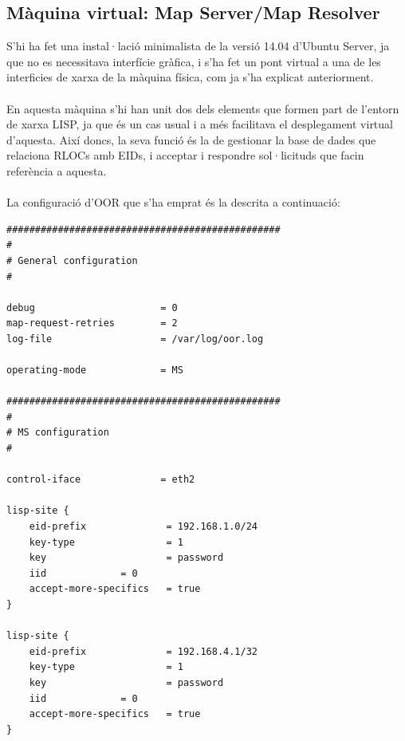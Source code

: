 \documentclass[11pt]{article}
\begin{document}
\subsection{Màquina virtual: Map Server/Map Resolver}
S’hi ha fet una instal·lació minimalista de la versió 14.04 d’Ubuntu Server, ja que no es necessitava interfície gràfica, i s’ha fet un pont virtual a una de les interficies de xarxa de la màquina física, com ja s’ha explicat anteriorment.\\
\\
En aquesta màquina s’hi han unit dos dels elements que formen part de l’entorn de xarxa LISP, ja que és un cas usual i a més facilitava el desplegament virtual d’aquesta. Així doncs, la seva funció és la de gestionar la base de dades que relaciona RLOCs amb EIDs, i acceptar i respondre sol·licituds que facin referència a aquesta.\\
\\
La configuració d’OOR que s’ha emprat és la descrita a continuació:\\
\begin{lstlisting}[frame=single]
################################################
#
# General configuration
#

debug                      = 0 
map-request-retries        = 2
log-file                   = /var/log/oor.log
 
operating-mode             = MS

################################################
#
# MS configuration
#

control-iface              = eth2

lisp-site {
    eid-prefix            	= 192.168.1.0/24
    key-type              	= 1
    key                   	= password
    iid				= 0
    accept-more-specifics	= true
}

lisp-site {
    eid-prefix            	= 192.168.4.1/32
    key-type              	= 1
    key                   	= password
    iid				= 0
    accept-more-specifics	= true
}
\end{lstlisting}
\end{document}
